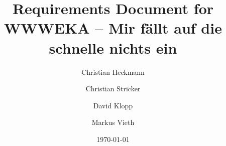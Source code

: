 \documentclass{book}
\title{Requirements Document for \\
WWWEKA -- Mir fällt auf die schnelle nichts ein}
\author{Christian Heckmann \and Christian Stricker \and David Klopp \and Markus Vieth}
\date{\today}
\begin{document}

\maketitle


\printglossaries

\tableofcontents




\end{document}
